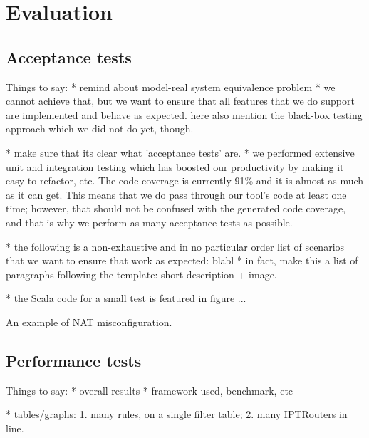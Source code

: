\chapter{Evaluation}\label{chapter:eval}

\section{Acceptance tests}



Things to say:
* remind about model-real system equivalence problem
* we cannot achieve that, but we want to ensure that all features that we do
support are implemented and behave as expected. here also mention the black-box
testing approach which we did not do yet, though.

* make sure that its clear what 'acceptance tests' are.
* we performed extensive unit and integration testing which has boosted our
productivity by making it easy to refactor, etc.  The code coverage is
currently 91\% and it is almost as much as it can get.  This means that we do
pass through our tool's code at least one time; however, that should not be
confused with the generated code coverage, and that is why we perform as many
acceptance tests as possible.

* the following is a non-exhaustive and in no particular order list of
scenarios that we want to ensure that work as expected: blabl
* in fact, make this a list of paragraphs following the template: short
description + image.


* the Scala code for a small test is featured in figure ...
\begin{listing}[H]
  \caption{An example of NAT misconfiguration.}
  \label{lst:example}
\end{listing}


\section{Performance tests}

Things to say:
* overall results
* framework used, benchmark, etc

* tables/graphs: 1. many rules, on a single filter table; 2. many IPTRouters in
line.
